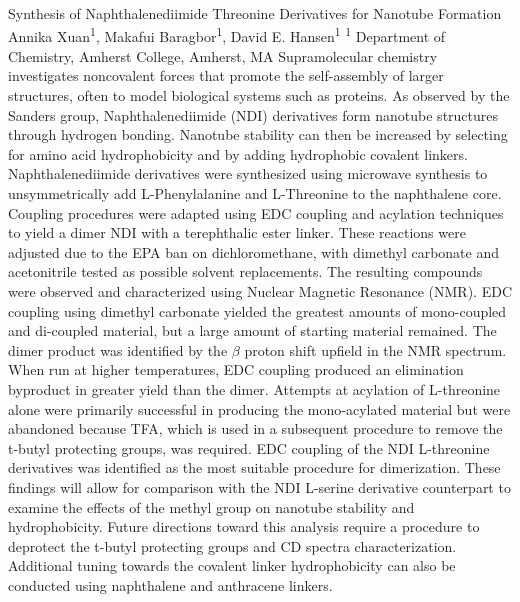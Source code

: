 \makeabstract
    {
    Synthesis of Naphthalenediimide Threonine Derivatives for Nanotube Formation
    }
    {
    Annika Xuan\textsuperscript{1}, Makafui Baragbor\textsuperscript{1}, David E. Hansen\textsuperscript{1}
    }
    {
    \textsuperscript{1} Department of Chemistry, Amherst College, Amherst, MA
    }
    {
    Supramolecular chemistry investigates noncovalent forces that promote the self-assembly of larger structures, often to model biological systems such as proteins. As observed by the Sanders group, Naphthalenediimide (NDI) derivatives form nanotube structures through hydrogen bonding. Nanotube stability can then be increased by selecting for amino acid hydrophobicity and by adding hydrophobic covalent linkers. 
    }
    {
    Naphthalenediimide derivatives were synthesized using microwave synthesis to unsymmetrically add L-Phenylalanine and L-Threonine to the naphthalene core. Coupling procedures were adapted using EDC coupling and acylation techniques to yield a dimer NDI with a terephthalic ester linker. These reactions were adjusted due to the EPA ban on dichloromethane, with dimethyl carbonate and acetonitrile tested as possible solvent replacements. The resulting compounds were observed and characterized using Nuclear Magnetic Resonance (NMR).
    }
    {
    EDC coupling using dimethyl carbonate yielded the greatest amounts of mono-coupled and di-coupled material, but a large amount of starting material remained. The dimer product was identified by the \ensuremath{\beta} proton shift upfield in the NMR spectrum. When run at higher temperatures, EDC coupling produced an elimination byproduct in greater yield than the dimer. Attempts at acylation of L-threonine alone were primarily successful in producing the mono-acylated material but were abandoned because TFA, which is used in a subsequent procedure to remove the t-butyl protecting groups, was required. 
    }
    {
    EDC coupling of the NDI L-threonine derivatives was identified as the most suitable procedure for dimerization. These findings will allow for comparison with the NDI L-serine derivative counterpart to examine the effects of the methyl group on nanotube stability and hydrophobicity. Future directions toward this analysis require a procedure to deprotect the t-butyl protecting groups and CD spectra characterization. Additional tuning towards the covalent linker hydrophobicity can also be conducted using naphthalene and anthracene linkers. 
    }

    \newpage
    
